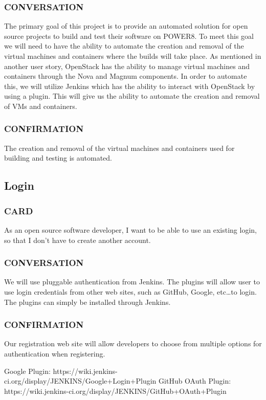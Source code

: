 \documentclass[10pt,letterpaper,onecolumn,journal]{IEEEtran}
\begin{document}
\subsubsection{CONVERSATION}
The primary goal of this project is to provide an automated solution for open source projects to build and test their software on POWER8.
To meet this goal we will need to have the ability to automate the creation and removal of the virtual machines and containers where the builds will take place.
As mentioned in another user story, OpenStack has the ability to manage virtual machines and containers through the Nova and Magnum components.
In order to automate this, we will utilize Jenkins which has the ability to interact with OpenStack by using a plugin.
This will give us the ability to automate the creation and removal of VMs and containers.
\subsubsection{CONFIRMATION}
The creation and removal of the virtual machines and containers used for building and testing is automated.

\subsection{Login}
\subsubsection{CARD}
As an open source software developer, I want to be able to use an existing login, so that I don't have to create another account.
\subsubsection{CONVERSATION}
We will use pluggable authentication from Jenkins. The plugins will allow user to use login credentials from other web sites, such as GitHub, Google, etc\ldots to login. The plugins can simply be installed through Jenkins.
\subsubsection{CONFIRMATION}
Our registration web site will allow developers to choose from multiple options for authentication when registering.

Google Plugin: https://wiki.jenkins-ci.org/display/JENKINS/Google+Login+Plugin
GitHub OAuth Plugin: https://wiki.jenkins-ci.org/display/JENKINS/GitHub+OAuth+Plugin
\end{document}
